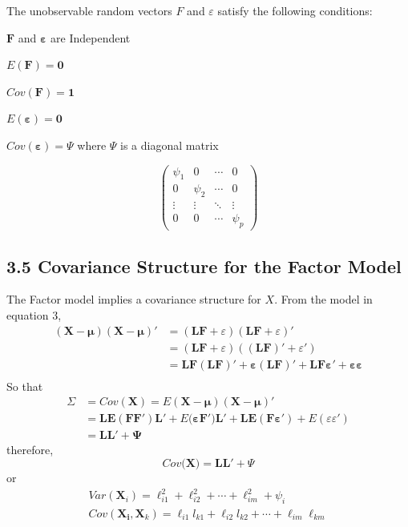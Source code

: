 \documentclass[12]{article}
\begin{document}
\noindent The unobservable random vectors $F$ and $\varepsilon$ satisfy the following conditions:
\begin{bracketedromanenum}
	\item  $\mathbf{F}$ and $\mathbf{\varepsilon}$ are Independent\\
	\item $E(\mathbf{F})= \mathbf{0}$\\
	\item  $Cov(\mathbf{F})= \mathbf{1}$\\
	\item  $E(\mathbf{\varepsilon})= \mathbf{0}$\\
	\item  $Cov(\mathbf{\varepsilon})= \Psi $ where $\Psi$ is a diagonal matrix
	
	$$\begin{pmatrix}
		\psi_{1} & 0 & \cdots & 0 \\
		0 & \psi_{2} & \cdots & 0 \\
		\vdots & \vdots & \ddots & \vdots \\
		0 & 0 & \cdots & \psi_{p}
	\end{pmatrix}$$
\end{bracketedromanenum}

\subsection*{3.5 Covariance Structure for the  Factor Model}
\noindent The Factor model implies a covariance structure for $X$. From the 
model in equation 3, 
\begin{equation}
	\begin{aligned}
		(\mathbf{X}-\mathbf{\mu})(\mathbf{X}-\mathbf{\mu})' &= (\mathbf{LF}+\varepsilon)(\mathbf{LF}+\varepsilon)' \\
		&= (\mathbf{LF}+\varepsilon)((\mathbf{LF})'+\varepsilon') \\
		&= \mathbf{LF(LF)'} + \mathbf{\varepsilon(LF)' + LF\varepsilon' + \varepsilon\varepsilon }\\
	\end{aligned}
\end{equation}
So that
\begin{equation}
	\begin{aligned}
		\Sigma & = Cov(\mathbf{X}) = E(\mathbf{X-\mu})(\mathbf{X-\mu})' \\
		&=\mathbf{LE(FF')L'}+ E(\mathbf{\varepsilon F')L' + LE(F\varepsilon')}+E(\varepsilon\varepsilon')\\
		&= \mathbf{LL' + \Psi}
	\end{aligned}
\end{equation}
\noindent therefore,
$$Cov(\mathbf{X)=LL'} +\Psi$$ 
or
\begin{equation}
	\begin{aligned}
		Var(\mathbf{X}_i)= \ell_{i1}^2 + \ell_{i2}^2 + \cdots +\ell_{im}^2 + \psi_i \\
		Cov(\mathbf{X_i},\mathbf{X}_k) = \ell_{i1}l_{k1} + \ell_{i2}l_{k2} + \cdots +\ell_{im}\ell_{km}
	\end{aligned}
\end{equation}
\end{document}
